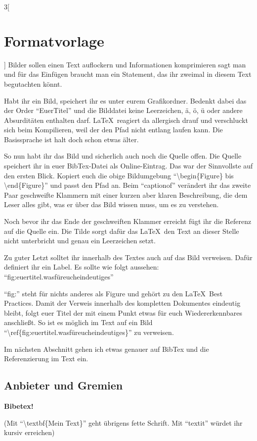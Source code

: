 \begin{multicols}{3}[\section{Formatvorlage}]
Bilder sollen einen Text auflockern und Informationen komprimieren sagt man und für das Einfügen braucht man ein Statement, das ihr zweimal in diesem Text begutachten könnt. 

Habt ihr ein Bild, speichert ihr es unter eurem Grafikordner. Bedenkt dabei das der Order \enquote{EuerTitel} und die Bilddatei keine Leerzeichen, ä, ö, ü oder andere Absurditäten enthalten darf. \LaTeX~reagiert da allergisch drauf und verschluckt sich beim Kompilieren, weil der den Pfad nicht entlang laufen kann. Die Basissprache ist halt doch schon etwas älter.

So nun habt ihr das Bild und sicherlich auch noch die Quelle offen. Die Quelle speichert ihr in euer BibTex-Datei als Online-Eintrag. Das war der Sinnvollste auf den ersten Blick. Kopiert euch die obige Bildumgebung \enquote{\textbackslash begin\{Figure\} bis \textbackslash end\{Figure\}} und passt den Pfad an. Beim \enquote{captionof} verändert ihr das zweite Paar geschweifte Klammern mit einer kurzen aber klaren Beschreibung, die dem Leser alles gibt, was er über das Bild wissen muss, um es zu verstehen. 

Noch bevor ihr das Ende der geschweiften Klammer erreicht fügt ihr die Referenz auf die Quelle ein. Die Tilde sorgt dafür das \LaTeX~den Text an dieser Stelle nicht unterbricht und genau ein Leerzeichen setzt. 

Zu guter Letzt solltet ihr innerhalb des Textes auch auf das Bild verweisen. Dafür definiert ihr ein Label. Es sollte wie folgt aussehen: \enquote{fig:euertitel.wasfüreucheindeutiges}

\enquote{fig:} steht für nichts anderes als Figure und gehört zu den \LaTeX~Best Practices. Damit der Verweis innerhalb des kompletten Dokumentes eindeutig bleibt, folgt euer Titel der mit einem Punkt etwas für euch Wiedererkennbares anschließt. So ist es möglich im Text auf ein Bild \enquote{\textbackslash ref\{fig:euertitel.wasfüreucheindeutiges\}} zu verweisen. 

Im nächsten Abschnitt gehen ich etwas genauer auf BibTex und die Referenzierung im Text ein.

\subsection*{Anbieter und Gremien}
\textbf{Bibetex!} 

(Mit \enquote{\textbackslash textbf\{Mein Text\}} geht übrigens fette Schrift. Mit \enquote{textit} würdet ihr kursiv erreichen)


\end{multicols}
